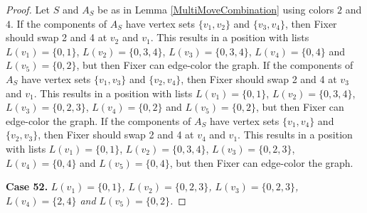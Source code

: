\documentclass[12pt]{amsart}
\theoremstyle{plain}
\theoremstyle{definition}
\theoremstyle{remark}
\begin{document}
\begin{proof}
Let $S$ and $A_S$ be as in Lemma \ref{MultiMoveCombination} using colors $2$ and $4$. If the components of $A_S$ have vertex sets $\{v_1, v_2\}$ and $\{v_3, v_4\}$, then Fixer should swap 2 and 4 at $v_2$ and $v_1$. This results in a position with lists $L(v_1) = \{0, 1\}$, $L(v_2) = \{0, 3, 4\}$, $L(v_3) = \{0, 3, 4\}$, $L(v_4) = \{0, 4\}$ and $L(v_5) = \{0, 2\}$, but then Fixer can edge-color the graph.
If the components of $A_S$ have vertex sets $\{v_1, v_3\}$ and $\{v_2, v_4\}$, then Fixer should swap 2 and 4 at $v_3$ and $v_1$. This results in a position with lists $L(v_1) = \{0, 1\}$, $L(v_2) = \{0, 3, 4\}$, $L(v_3) = \{0, 2, 3\}$, $L(v_4) = \{0, 2\}$ and $L(v_5) = \{0, 2\}$, but then Fixer can edge-color the graph.
If the components of $A_S$ have vertex sets $\{v_1, v_4\}$ and $\{v_2, v_3\}$, then Fixer should swap 2 and 4 at $v_4$ and $v_1$. This results in a position with lists $L(v_1) = \{0, 1\}$, $L(v_2) = \{0, 3, 4\}$, $L(v_3) = \{0, 2, 3\}$, $L(v_4) = \{0, 4\}$ and $L(v_5) = \{0, 4\}$, but then Fixer can edge-color the graph.

\noindent\textbf{Case 52.  }\textit{$L(v_1) = \{0, 1\}$, $L(v_2) = \{0, 2, 3\}$, $L(v_3) = \{0, 2, 3\}$, $L(v_4) = \{2, 4\}$ and $L(v_5) = \{0, 2\}$.}


\end{proof}
\end{document}
